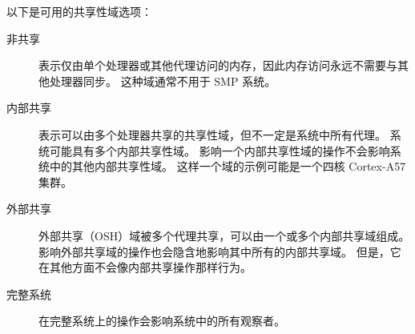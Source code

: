 以下是可用的共享性域选项：

\begin{description}
\item
  [非共享] 表示仅由单个处理器或其他代理访问的内存，因此内存访问永远不需要与其他处理器同步。
  这种域通常不用于 SMP 系统。
\item
  [内部共享] 表示可以由多个处理器共享的共享性域，但不一定是系统中所有代理。
  系统可能具有多个内部共享性域。
  影响一个内部共享性域的操作不会影响系统中的其他内部共享性域。
  这样一个域的示例可能是一个四核 Cortex-A57 集群。
\item
  [外部共享] 外部共享（OSH）域被多个代理共享，可以由一个或多个内部共享域组成。
  影响外部共享域的操作也会隐含地影响其中所有的内部共享域。
  但是，它在其他方面不会像内部共享操作那样行为。
\item
  [完整系统] 在完整系统上的操作会影响系统中的所有观察者。
\end{description}

